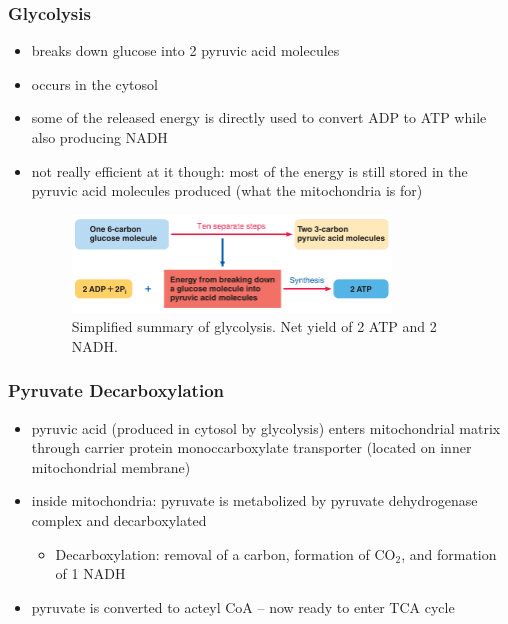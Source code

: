 \documentclass[10pt]{article}
\begin{document}
\subsubsection*{Glycolysis}
\begin{itemize}
    \item breaks down glucose into 2 pyruvic acid molecules
    \item occurs in the cytosol
    \item some of the released energy is directly used to convert ADP to ATP while also producing NADH
    \item not really efficient at it though: most of the energy is still stored in the pyruvic acid molecules produced (what the mitochondria is for)
        \begin{figure}[h]
            \centering
            \includegraphics[width=0.8\textwidth]{glycolysis}
            \caption{Simplified summary of glycolysis. Net yield of 2 ATP and 2 NADH.}
            \label{fig:glycolysis}
        \end{figure}
\end{itemize}

\subsubsection*{Pyruvate Decarboxylation}
\begin{itemize}
    \item pyruvic acid (produced in cytosol by glycolysis) enters mitochondrial matrix through carrier protein monoccarboxylate transporter (located on inner mitochondrial membrane)
    \item inside mitochondria: pyruvate is metabolized by pyruvate dehydrogenase complex and decarboxylated
        \begin{itemize}
            \item Decarboxylation: removal of a carbon, formation of CO$_2$, and formation of 1 NADH
        \end{itemize}
    \item pyruvate is converted to acteyl CoA -- now ready to enter TCA cycle
\end{itemize}
\end{document}
